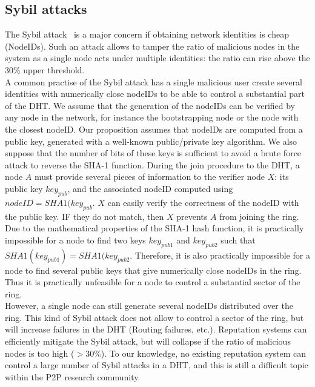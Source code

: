 \subsection{Sybil attacks}
\label{sec:sybil_attacks}

The Sybil attack~\cite{the_sybil_attack} is a major concern if obtaining
network identities is cheap (NodeIDs). Such an attack allows to tamper the ratio of
malicious nodes in the system as a single node acts under multiple identities:
the ratio can rise above the $30\%$ upper threshold. \\

A common practise of the Sybil attack has a single malicious user create
several identities with numerically close nodeIDs to be able to control a
substantial part of the DHT. We assume that the generation of the nodeIDs can
be verified by any node in the network, for instance the bootstrapping node or
the node with the closest nodeID. Our proposition assumes that nodeIDs are
computed from a public key, generated with a well-known public/private key
algorithm. We also suppose that the number of bits of these keys is sufficient
to avoid a brute force attack to reverse the SHA-1 function. During the join
procedure to the DHT, a node $A$ must provide several pieces of information to
the verifier node $X$: its public key $key_{pub}$, and the associated nodeID computed using
$nodeID = SHA1(key_{pub}$. $X$ can easily verify the correctness of the nodeID
with the public key. IF they do not match, then $X$ prevents $A$ from joining
the ring.\\

Due to the mathematical properties of the SHA-1 hash function, it is
practically impossible for a node to find two keys $key_{pub1}$ and
$key_{pub2}$ such that $SHA1(key_{pub1}) = SHA1(key_{pub2}$. Therefore, it is
also practically impossible for a node to find several public keys that give
numerically close nodeIDs in the ring. Thus it is practically unfeasible for a
node to control a substantial sector of the ring.\\

However, a single node can still generate several nodeIDs distributed over the
ring. This kind of Sybil attack does not allow to control a sector of the ring,
but will increase failures in the DHT (Routing failures, etc.).  Reputation
systems can efficiently mitigate the Sybil attack, but will collapse if the
ratio of malicious nodes is too high ($> 30\%$). To our knowledge, no existing reputation system can control a large
number of Sybil attacks in a DHT, and this is still a difficult topic within
the P2P research community.\\

